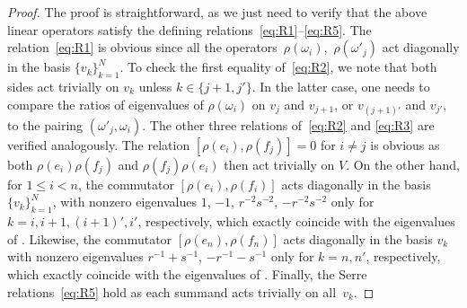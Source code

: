 \documentclass[10pt,a4paper]{amsart}
\numberwithin{equation}{section}
\begin{document}
\begin{proof}
The proof is straightforward, as we just need to verify that the above linear operators satisfy the defining relations~\eqref{eq:R1}--\eqref{eq:R5}. The relation~\eqref{eq:R1} is obvious since all the operators~$\rho(\omega_i)$,~$\rho(\omega'_j)$ act diagonally in the basis $\{v_k\}_{k=1}^N$. To check the first equality of~\eqref{eq:R2}, we note that both sides act trivially on $v_k$ unless $k\in \{j+1,j'\}$. In the latter case, one needs to compare the ratios of eigenvalues of $\rho(\omega_i)$ on
$v_{j}$ and $v_{j+1}$, or $v_{(j+1)'}$ and $v_{j'}$, to the pairing $(\omega'_j,\omega_i)$. The other three relations of~\eqref{eq:R2} and \eqref{eq:R3} are verified analogously. The relation $[\rho(e_i),\rho(f_j)]=0$ for $i\ne j$ is obvious as both $\rho(e_i)\rho(f_j)$ and $\rho(f_j)\rho(e_i)$ then act trivially on $V$. On the other hand, for $1\leq i<n$, the commutator $[\rho(e_i),\rho(f_i)]$ acts diagonally in the basis $\{v_k\}_{k=1}^N$, with nonzero eigenvalues $1$, $-1$, $r^{-2}s^{-2}$, $-r^{-2}s^{-2}$ only for $k=i,i+1,(i+1)',i'$, respectively, which exactly coincide with the eigenvalues of . Likewise, the commutator $[\rho(e_n),\rho(f_n)]$ acts diagonally in the basis $v_k$ with nonzero eigenvalues $r^{-1}+s^{-1}$, $-r^{-1}-s^{-1}$ only for $k=n,n'$, respectively, which exactly coincide with the eigenvalues of . Finally, the Serre relations~\eqref{eq:R5} hold as each summand acts trivially on all~$v_k$.
\end{proof}
\end{document}
